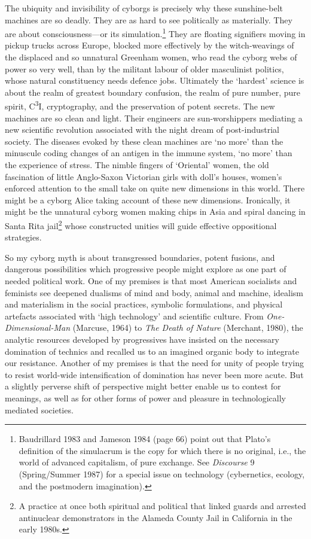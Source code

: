 \documentclass[DIV=12,%
               BCOR=10mm,%
               headinclude=false,%
               footinclude=false,open=any,%
               fontsize=11pt,%
               twoside,%
               paper=210mm:11in]%
               {scrbook}
\newcommand*{\Slash}{\slash\hspace{0pt}}
\begin{document}
The ubiquity and invisibility of cyborgs is precisely why these sunshine-belt machines are so deadly. They are as hard to see politically as materially. They are about consciousness—or its simulation.\footnote{Baudrillard 1983 and Jameson 1984 (page 66) point out that Plato’s definition of the simulacrum is the copy for which there is no original, i.e., the world of advanced capitalism, of pure exchange. See \emph{Discourse} 9 (Spring\Slash{}Summer 1987) for a special issue on technology (cybernetics, ecology, and the postmodern imagination).} They are floating signifiers moving in pickup trucks across Europe, blocked more effectively by the witch-weavings of the displaced and so unnatural Greenham women, who read the cyborg webs of power so very well, than by the militant labour of older masculinist politics, whose natural constituency needs defence jobs. Ultimately the ‘hardest’ science is about the realm of greatest boundary confusion, the realm of pure number, pure spirit, C\textsuperscript{3}I, cryptography, and the preservation of potent secrets. The new machines are so clean and light. Their engineers are sun-worshippers mediating a new scientific revolution associated with the night dream of post-industrial society. The diseases evoked by these clean machines are ‘no more’ than the minuscule coding changes of an antigen in the immune system, ‘no more’ than the experience of stress. The nimble fingers of ‘Oriental’ women, the old fascination of little Anglo-Saxon Victorian girls with doll’s houses, women’s enforced attention to the small take on quite new dimensions in this world. There might be a cyborg Alice taking account of these new dimensions. Ironically, it might be the unnatural cyborg women making chips in Asia and spiral dancing in Santa Rita jail\footnote{A practice at once both spiritual and political that linked guards and arrested antinuclear demonstrators in the Alameda County Jail in California in the early 1980s.} whose constructed unities will guide effective oppositional strategies.


So my cyborg myth is about transgressed boundaries, potent fusions, and dangerous possibilities which progressive people might explore as one part of needed political work. One of my premises is that most American socialists and feminists see deepened dualisms of mind and body, animal and machine, idealism and materialism in the social practices, symbolic formulations, and physical artefacts associated with ‘high technology’ and scientific culture. From \emph{One-Dimensional-Man} (Marcuse, 1964) to \emph{The Death of Nature} (Merchant, 1980), the analytic resources developed by progressives have insisted on the necessary domination of technics and recalled us to an imagined organic body to integrate our resistance. Another of my premises is that the need for unity of people trying to resist world-wide intensification of domination has never been more acute. But a slightly perverse shift of perspective might better enable us to contest for meanings, as well as for other forms of power and pleasure in technologically mediated societies.
\end{document}

